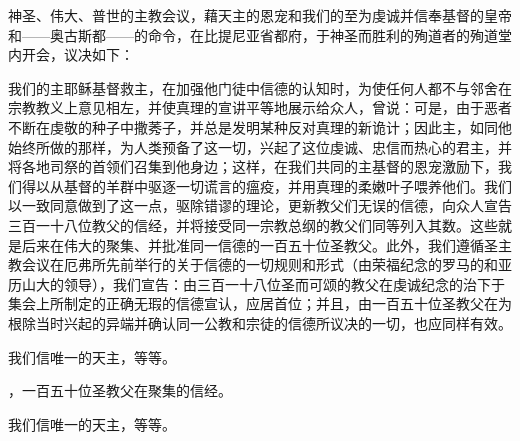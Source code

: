 神圣、伟大、普世的主教会议，藉天主的恩宠和我们的至为虔诚并信奉基督的皇帝和——奥古斯都——的命令，在比提尼亚省都府，于神圣而胜利的殉道者的殉道堂内开会，议决如下：\par

我们的主耶稣基督救主，在加强他门徒中信德的认知时，为使任何人都不与邻舍在宗教教义上意见相左，并使真理的宣讲平等地展示给众人，曾说：可是，由于恶者不断在虔敬的种子中撒莠子，并总是发明某种反对真理的新诡计；因此主，如同他始终所做的那样，为人类预备了这一切，兴起了这位虔诚、忠信而热心的君主，并将各地司祭的首领们召集到他身边；这样，在我们共同的主基督的恩宠激励下，我们得以从基督的羊群中驱逐一切谎言的瘟疫，并用真理的柔嫩叶子喂养他们。我们以一致同意做到了这一点，驱除错谬的理论，更新教父们无误的信德，向众人宣告三百一十八位教父的信经，并将接受同一宗教总纲的教父们同等列入其数。这些就是后来在伟大的聚集、并批准同一信德的一百五十位圣教父。此外，我们遵循圣主教会议在厄弗所先前举行的关于信德的一切规则和形式（由荣福纪念的罗马的和亚历山大的领导），我们宣告：由三百一十八位圣而可颂的教父在虔诚纪念的治下于集会上所制定的正确无瑕的信德宣认，应居首位；并且，由一百五十位圣教父在为根除当时兴起的异端并确认同一公教和宗徒的信德所议决的一切，也应同样有效。\par

\par

我们信唯一的天主，等等。\par

，一百五十位圣教父在聚集的信经。\par

我们信唯一的天主，等等。\par

